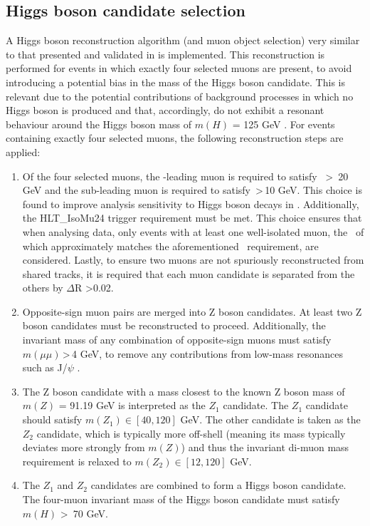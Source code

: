 \subsection{Higgs boson candidate selection}
A Higgs boson reconstruction algorithm (and muon object selection) very similar to that presented and validated in \cite{HIG19-001} is implemented. This reconstruction is performed for events in which exactly four selected muons are present, to avoid introducing a potential bias in the mass of the Higgs boson candidate. This is relevant due to the potential contributions of background processes in which no Higgs boson is produced and that, accordingly, do not exhibit a resonant behaviour around the Higgs boson mass of $m(H)$ = 125 GeV \cite{PhysRevD.110.030001}. For events containing exactly four selected muons, the following reconstruction steps are applied:
\begin{enumerate}
    \item Of the four selected muons, the \pt-leading muon is required to satisfy \pt \, \textgreater\, 20 GeV and the sub-leading muon is required to satisfy \pt \,\textgreater\,10 GeV. This choice is found to improve analysis sensitivity to Higgs boson decays in \cite{HIG19-001}. Additionally, the HLT\_IsoMu24 trigger requirement must be met. This choice ensures that when analysing data, only events with at least one well-isolated muon, the \pt \, of which approximately matches the aforementioned \pt \, requirement, are considered. Lastly, to ensure two muons are not spuriously reconstructed from shared tracks, it is required that each muon candidate is separated from the others by $\Delta$R \textgreater 0.02. 
    \item Opposite-sign muon pairs are merged into Z boson candidates. At least two Z boson candidates must be reconstructed to proceed. Additionally, the invariant mass of any combination of opposite-sign muons must satisfy $m(\mu\mu)\,$\textgreater \,4 GeV, to remove any contributions from low-mass resonances such as J/$\psi$ \cite{PhysRevD.110.030001}. 
    \item The Z boson candidate with a mass closest to the known Z boson mass of $m(Z)$ = 91.19 GeV \cite{PhysRevD.110.030001} is interpreted as the $Z_1$ candidate. The $Z_1$ candidate should satisfy $m(Z_{1})\in[40,120]$ GeV. The other candidate is taken as the $Z_2$ candidate, which is typically more off-shell (meaning its mass typically deviates more strongly from $m(Z)$) and thus the invariant di-muon mass requirement is relaxed to $m(Z_{2})\in[12,120]$ GeV. 
    \item The $Z_1$ and $Z_2$ candidates are combined to form a Higgs boson candidate. The four-muon invariant mass of the Higgs boson candidate must satisfy $m(H)$ \textgreater \, 70 GeV. 
\end{enumerate}
